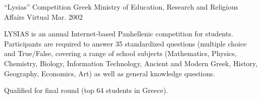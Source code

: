 \begin{cventries}
  \cventry
    {``Lysias'' Competition} %
    {Greek Ministry of Education, Research and Religious Affairs} %
    {Virtual} %
    {Mar. 2002} %
    {
      \begin{cvitems} %
        \item {LYSIAS is an annual Internet-based Panhellenic competition for students. Participants are required to answer 35 standardized questions (multiple choice and True/False, covering a range of school subjects (Mathematics, Physics, Chemistry, Biology, Information Technology, Ancient and Modern Greek, History, Geography, Economics, Art) as well as general knowledge questions.}
        \item {Qualified for final round (top 64 students in Greece).}
      \end{cvitems}
    }

\end{cventries}
